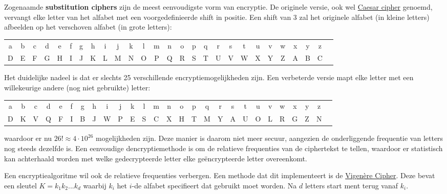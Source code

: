 \documentclass{report}
\begin{document}
	Zogenaamde \textbf{substitution ciphers} zijn de meest eenvoudigste vorm van encryptie. De originele versie, ook wel \underline{Caesar cipher} genoemd, vervangt elke letter van het alfabet met een voorgedefinieerde shift in positie. Een shift van 3 zal het originele alfabet (in kleine letters) afbeelden op het verschoven alfabet (in grote letters):
	\begin{table}[ht]
	\centering
	\setlength\tabcolsep{1pt}
	\begin{tabular}{c c c c c c c c c c c c c c c c c c c c c c c c c c c}
		a&b&c&d&e&f&g&h&i&j&k&l&m&n&o&p&q&r&s&t&u&v&w&x&y&z \\
		D&E&F&G&H&I&J&K&L&M&N&O&P&Q&R&S&T&U&V&W&X&Y&Z&A&B&C
	\end{tabular}
	\end{table}
	Het duidelijke nadeel is dat er slechts 25 verschillende encryptiemogelijkheden zijn. Een verbeterde versie mapt elke letter met een willekeurige andere (nog niet gebruikte) letter:
		\begin{table}[ht]
		\centering
		\setlength\tabcolsep{1pt}
		\begin{tabular}{c c c c c c c c c c c c c c c c c c c c c c c c c c c}
			a&b&c&d&e&f&g&h&i&j&k&l&m&n&o&p&q&r&s&t&u&v&w&x&y&z \\
			D&K&V&Q&F&I&B&J&W&P&E&S&C&X&H&T&M&Y&A&U&O&L&R&G&Z&N
		\end{tabular}
	\end{table}
	waardoor er nu $26! \approx 4\cdot10^{26}$ mogelijkheden zijn. Deze manier is daarom niet meer secuur, aangezien de onderliggende frequentie van letters nog steeds dezelfde is. Een eenvoudige dencryptiemethode is om de relatieve frequenties van de ciphertekst te tellen, waardoor er statistisch kan achterhaald worden met welke gedecrypteerde letter elke geëncrypteerde letter overeenkomt. 

	Een encryptiealgoritme wil ook de relatieve frequenties verbergen. Een methode dat dit implementeert is de \underline{Vigenère Cipher}. Deze bevat een sleutel $K = k_1k_2 ... k_d$ waarbij $k_i$ het $i$-de alfabet specifieert dat gebruikt moet worden. Na $d$ letters start ment terug vanaf $k_i$.
\end{document}
